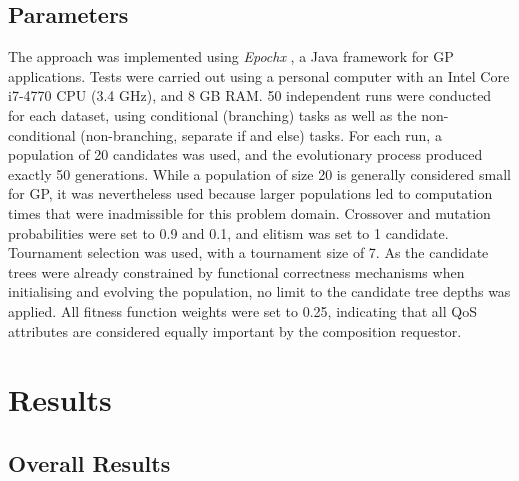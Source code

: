 \documentclass[conference]{IEEEtran}
\begin{document}
\subsection{Parameters}
The approach was implemented using \textit{Epochx} \cite{otero2012epochx}, a Java framework for GP applications. Tests were carried out using a personal computer with an Intel Core i7-4770 CPU (3.4 GHz), and 8 GB RAM. 50 independent runs were conducted for each dataset, using conditional (branching) tasks as well as the non-conditional (non-branching, separate if and else) tasks. For each run, a population of 20 candidates was used, and the evolutionary process produced exactly 50 generations. While a population of size 20 is generally considered small for GP, it was nevertheless used because larger populations led to computation times that were inadmissible for this problem domain. Crossover and mutation probabilities were set to 0.9 and 0.1, and elitism was set to 1 candidate. Tournament selection was used, with a tournament size of 7. As the candidate trees were already constrained by functional correctness mechanisms when initialising and evolving the population, no limit to the candidate tree depths was applied. All fitness function weights were set to 0.25, indicating that all QoS attributes are considered equally important by the composition requestor.

\vspace{-0.33cm}

\section{Results}\label{results}

\subsection{Overall Results}
\end{document}
